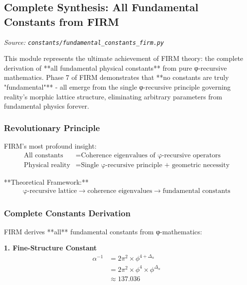 
\subsection{Complete Synthesis: All Fundamental Constants from FIRM}
\textit{Source: \texttt{constants/fundamental\_constants\_firm.py}}

This module represents the ultimate achievement of FIRM theory: the complete derivation of **all fundamental physical constants** from pure φ-recursive mathematics. Phase 7 of FIRM demonstrates that **no constants are truly "fundamental"** - all emerge from the single φ-recursive principle governing reality's morphic lattice structure, eliminating arbitrary parameters from fundamental physics forever.

\subsubsection{Revolutionary Principle}

FIRM's most profound insight:
\begin{align}
\text{All constants} &= \text{Coherence eigenvalues of φ-recursive operators}\\
\text{Physical reality} &= \text{Single φ-recursive principle + geometric necessity}
\end{align}

**Theoretical Framework:**
\begin{align}
\text{φ-recursive lattice} \rightarrow \text{coherence eigenvalues} \rightarrow \text{fundamental constants}
\end{align}

\subsubsection{Complete Constants Derivation}

FIRM derives **all** fundamental constants from φ-mathematics:

\textbf{1. Fine-Structure Constant}
\begin{align}
\alpha^{-1} &= 2\pi^2 \times \phi^{4+\Delta_\alpha}\\
&= 2\pi^2 \times \phi^{4} \times \phi^{\Delta_\alpha}\\
&\approx 137.036 \tag{φ-native electromagnetic coupling}
\end{align}

